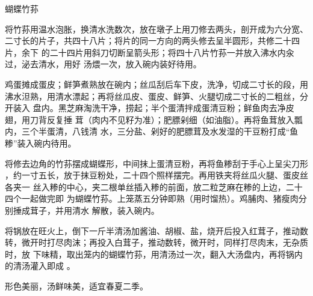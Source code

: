 \begin{recipe}{蝴蝶竹荪}

\ingredients


\preparation

\step 将竹荪用温水泡胀，换清水洗数次，放在墩子上用刀修去两头，剖开成为六分宽、
二寸长的片子，共四十八片；将片的同一方向的两头修去呈半圆形，共修二十四片，余下
的二十四片用斜刀切断呈箭头形；将四十八片竹荪一并放入沸水内汆过，泌去清水，用好
汤煨一次，放入碗内装好待用。

\step 鸡蛋摊成蛋皮；鲜笋煮熟放在碗内；丝瓜刮后车下皮，洗净，切成二寸长的段，用
沸水泹熟，用清水漂起；再将丝瓜皮、蛋皮、鲜笋、火腿切成二寸长的二粗丝，分开装入
盘内。黑芝麻淘洗干净，捞起；半个蛋清拌成蛋清豆粉；鲜鱼肉去净皮翅，用刀背反复捶
茸（肉内不见籽为准）；肥膘剁细（如油脂）。再将鱼茸放入瓢内，三个半蛋清，八钱清
水，三分盐、剁好的肥膘茸及水发湿的干豆粉打成“鱼糁”装入碗内待用。

\step 将修去边角的竹荪摆成蝴蝶形，中间抹上蛋清豆粉，再将鱼糁刮于手心上呈尖刀形
，约一寸五长，放于抹豆粉处，二十四个照样摆完。再用铁夹将丝瓜火腿、蛋皮丝各夹一
丝入糁的中心，夹二根单丝插入糁的前面，放二粒芝麻在糁的上边，二十四个一起做完即
为蝴蝶竹荪。上笼蒸五分钟即熟（用时馏热）。鸡脯肉、猪瘦肉分别捶成茸子，并用清水
解散，装入碗内。

\step 将锅放在旺火上，倒下一斤半清汤加酱油、胡椒、盐，烧开后投入红茸子，推动数
转，微开时打尽肉沫；再投入白茸子，推动数转，微开时，同样打尽肉末，无杂质时，放
下味精，取出笼内的蝴蝶竹荪，用清汤过一次，翻入大汤盘内，再将锅内的清汤灌入即成
。

\features

形色美丽，汤鲜味美，适宜春夏二季。

\end{recipe}

